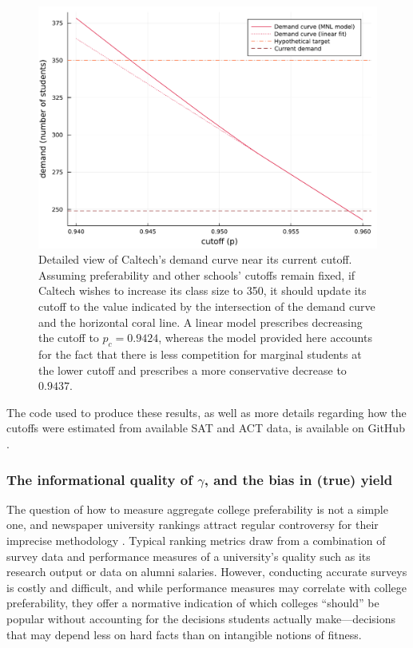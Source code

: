 \documentclass[12pt]{article}
\numberwithin{equation}{subsection}
\theoremstyle{definition}
\begin{document}
\begin{figure}
\begin{center}\includegraphics[width=\linewidth, ]{plots/caltech-demand-curve.pdf}\end{center}
\captionsetup{singlelinecheck=off}
    \caption[.]{Detailed view of Caltech's demand curve near its current cutoff. Assuming preferability and other schools' cutoffs remain fixed, if Caltech wishes to increase its class size to 350, it should update its cutoff to the value indicated by the intersection of the demand curve and the horizontal coral line. A linear model prescribes decreasing the cutoff to $p_c = 0.9424$, whereas the model provided here accounts for the fact that there is less competition for marginal students at the lower cutoff and prescribes a more conservative decrease to $0.9437$. }
\label{caltech-demand-curve}
\end{figure}








The code used to produce these results, as well as more details regarding how the cutoffs were estimated from available SAT and ACT data, is available on GitHub \parencite[][]{studentprefsrevopt}.



\subsubsection{The informational quality of $\gamma$, and the bias in (true) yield}
The question of how to measure aggregate college preferability is not a simple one, and newspaper university rankings attract regular controversy for their imprecise methodology \parencite[][]{intlrankingsandconflicts}. Typical ranking metrics draw from a combination of survey data and performance measures of a university's quality such as its research output or data on alumni salaries. However, conducting accurate surveys is costly and difficult, and while performance measures may correlate with college preferability, they offer a normative indication of which colleges ``should'' be popular without accounting for the decisions students actually make---decisions that may depend less on hard facts than on intangible notions of fitness.
\end{document}
